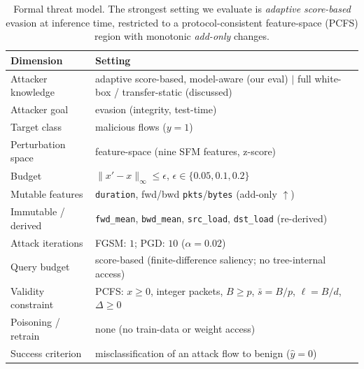\documentclass[11pt,a4paper]{article}
\begin{document}
\begin{table}[h]
\centering
\caption{Formal threat model. The strongest setting we evaluate is
\emph{adaptive score-based} evasion at inference time, restricted to a
protocol-consistent feature-space (PCFS) region with monotonic \emph{add-only}
changes.}
\label{tab:threatmodel}
\small
\begin{tabular}{ll}
\toprule
Dimension & Setting \\
\midrule
Attacker knowledge   & adaptive score-based, model-aware (our eval) $\vert$ full white-box / transfer-static (discussed) \\
Attacker goal        & evasion (integrity, test-time) \\
Target class         & malicious flows ($y{=}1$) \\
Perturbation space   & feature-space (nine SFM features, z-score) \\
Budget               & $\lVert x'-x\rVert_\infty \le \epsilon$, $\epsilon\in\{0.05,0.1,0.2\}$ \\
Mutable features     & \texttt{duration}, fwd/bwd \texttt{pkts}/\texttt{bytes} (add-only $\uparrow$) \\
Immutable / derived  & \texttt{fwd\_mean}, \texttt{bwd\_mean}, \texttt{src\_load}, \texttt{dst\_load} (re-derived) \\
Attack iterations    & FGSM: $1$; PGD: $10$ ($\alpha{=}0.02$) \\
Query budget         & score-based (finite-difference saliency; no tree-internal access) \\
Validity constraint  & PCFS: $x\ge0$, integer packets, $B\ge p$, $\bar{s}{=}B/p$, $\ell{=}B/d$, $\Delta\ge0$ \\
Poisoning / retrain  & none (no train-data or weight access) \\
Success criterion    & misclassification of an attack flow to benign ($\hat{y}{=}0$) \\
\bottomrule
\end{tabular}
\end{table}
\end{document}
